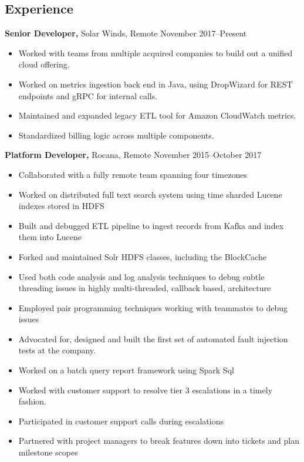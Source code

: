 \documentclass[margin]{res}
\begin{document}
\begin{resume}
\section{Experience}
 {\bf Senior Developer,} Solar Winds, Remote \hfill November 2017--Present
    \begin{itemize}
        \item Worked with teams from multiple acquired companies to build out
            a unified cloud offering.
        \item Worked on metrics ingestion back end in Java, using DropWizard
            for REST endpoints and gRPC for internal calls.
        \item Maintained and expanded legacy ETL tool for Amazon CloudWatch
            metrics.
        \item Standardized billing logic across multiple components.
    \end{itemize}
 {\bf Platform Developer,} Rocana, Remote \hfill November 2015--October 2017
\begin{itemize}
    \item Collaborated with a fully remote team spanning four timezones
    \item Worked on distributed full text search system using time sharded
        Lucene indexes stored in HDFS
    \item Built and debugged ETL pipeline to ingest records from Kafka
        and index them into Lucene
    \item Forked and maintained Solr HDFS classes, including the BlockCache
    \item Used both code analysis and log analysis techniques to debug subtle
        threading issues in highly multi-threaded, callback based, architecture
    \item Employed pair programming techniques working with teammates to debug
        issues
    \item Advocated for, designed and built the first set of automated fault
        injection tests at the company.
    \item Worked on a batch query report framework using Spark Sql
    \item Worked with customer support to resolve tier 3 escalations in a
        timely fashion.
    \item Participated in customer support calls during escalations
    \item Partnered with project managers to break features down into tickets
        and plan milestone scopes
\end{itemize}


\end{resume}
\end{document}
